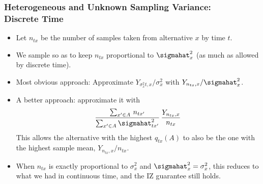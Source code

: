 {\begin{frame}
\frametitle{Heterogeneous and Unknown Sampling Variance: \\ Discrete Time}
\begin{itemize}
  \item Let $n_{tx}$ be the number of samples taken from alternative $x$ by time $t$. 
  \item We sample so as to keep $n_{tx}$ proportional to $\sigmahat^2_x$ (as much as allowed by discrete time).
  \item Most obvious approach:  Approximate $Y_{\sigma_x^2 t,x} / \sigma_x^2$
    with $Y_{n_{tx},x} / \sigmahat^2_x$.
  \item A better approach: approximate it with
    \begin{equation*}
      \frac{\sum_{x'\in A} \,n_{tx'}}{\sum_{x'\in A}\sigmahat^2_{tx'}} \,\frac{Y_{n_{tx},x}}{n_{tx}}
    \end{equation*}
  This allows the alternative with the highest $q_{tx}(A)$ to also be the one with the highest sample mean, $Y_{n_{tx},x}/n_{tx}$.
  \item When $n_{tx}$ is exactly proportional to $\sigma^2_x$ and $\sigmahat^2_x = \sigma^2_x$, this reduces to what we had in continuous time, and the IZ guarantee still holds.
\end{itemize}
\end{frame}





}
